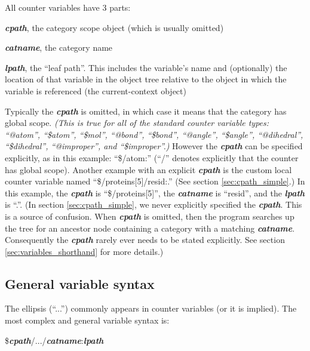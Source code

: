 \documentclass[11pt]{article}
\begin{document}
All counter variables have 3 parts: 

\begin{list}{}
\item
\textit{\textbf{cpath}}, the category scope object (which is usually omitted)
\item
\textit{\textbf{catname}}, the category name
\item
\textit{\textbf{lpath}}, the ``leaf path''. 
               This includes the variable's name and (optionally) 
               the location of that variable in the object tree relative 
               to the object in which the variable is referenced
               (the current-context object)
\item
\end{list}

Typically the \textit{\textbf{cpath}} is omitted, 
in which case it means that the category has global scope. 
\textit{(This is true for all of the standard counter variable types:
``@atom'', ``\$atom'', ``\$mol'',
``@bond'', ``\$bond'',
``@angle'', ``\$angle'',
``@dihedral'', ``\$dihedral'',
``@improper'', and ``\$improper''.)}
However the \textit{\textbf{cpath}} can be specified 
explicitly, as in this example: ``\$/atom:''
(``/'' denotes explicitly that the counter has global scope).
Another example with an explicit \textit{\textbf{cpath}} is
the custom local counter variable named ``\$/proteins[5]/resid:.'' 
(See section \ref{sec:cpath_simple}.)
In this example, the \textit{\textbf{cpath}} is ``\$/proteins[5]'', the 
\textit{\textbf{catname}} is ``resid'', 
and the \textit{\textbf{lpath}} is ``.''.
(In section 
\ref{sec:cpath_simple}, 
we never explicitly specified the \textit{\textbf{cpath}}. 
This is a source of confusion.
When \textit{\textbf{cpath}} is omitted,
then the program searches up the tree for an ancestor node
containing a category with a matching \textit{\textbf{catname}}.  Consequently
the \textit{\textbf{cpath}} rarely ever needs to be stated explicitly.
See section \ref{sec:variables_shorthand} for more details.)


\subsection{General variable syntax}
The ellipsis (``...'') commonly appears in counter variables 
(or it is implied).  The most complex and general variable syntax is:

\$\textit{\textbf{cpath}}/.../\textit{\textbf{catname}}:\textit{\textbf{lpath}}
\end{document}
